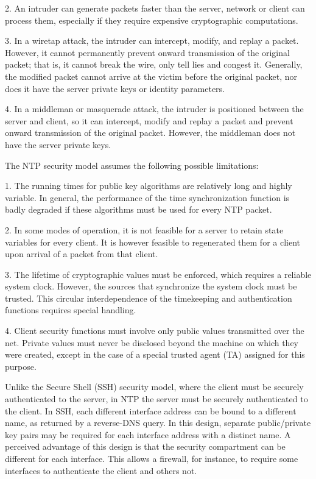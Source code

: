    2.  An intruder can generate packets faster than the server, network
       or client can process them, especially if they require expensive
       cryptographic computations.

   3.  In a wiretap attack, the intruder can intercept, modify, and
       replay a packet.  However, it cannot permanently prevent onward
       transmission of the original packet; that is, it cannot break the
       wire, only tell lies and congest it.  Generally, the modified
       packet cannot arrive at the victim before the original packet,
       nor does it have the server private keys or identity parameters.

   4.  In a middleman or masquerade attack, the intruder is positioned
       between the server and client, so it can intercept, modify and
       replay a packet and prevent onward transmission of the original
       packet.  However, the middleman does not have the server private
       keys.

   The NTP security model assumes the following possible limitations:

   1.  The running times for public key algorithms are relatively long
       and highly variable.  In general, the performance of the time
       synchronization function is badly degraded if these algorithms
       must be used for every NTP packet.

   2.  In some modes of operation, it is not feasible for a server to
       retain state variables for every client.  It is however feasible
       to regenerated them for a client upon arrival of a packet from
       that client.

   3.  The lifetime of cryptographic values must be enforced, which
       requires a reliable system clock.  However, the sources that
       synchronize the system clock must be trusted.  This circular
       interdependence of the timekeeping and authentication functions
       requires special handling.

   4.  Client security functions must involve only public values
       transmitted over the net.  Private values must never be disclosed
       beyond the machine on which they were created, except in the case
       of a special trusted agent (TA) assigned for this purpose.

   Unlike the Secure Shell (SSH) security model, where the client must
   be securely authenticated to the server, in NTP the server must be
   securely authenticated to the client.  In SSH, each different
   interface address can be bound to a different name, as returned by a
   reverse-DNS query.  In this design, separate public/private key pairs
   may be required for each interface address with a distinct name.  A
   perceived advantage of this design is that the security compartment
   can be different for each interface.  This allows a firewall, for
   instance, to require some interfaces to authenticate the client and
   others not.


